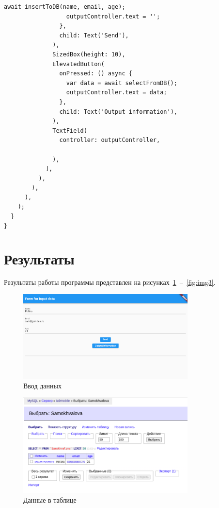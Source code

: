 \documentclass[a4paper, 14pt]{extarticle}
\begin{document}
\begin{lstlisting}[language={},caption={Форма отправки данных в базу данных MySql},label={lst:code1}]
                  await insertToDB(name, email, age);
                  outputController.text = '';
                },
                child: Text('Send'),
              ),
              SizedBox(height: 10),
              ElevatedButton(
                onPressed: () async {
                  var data = await selectFromDB();
                  outputController.text = data;
                },
                child: Text('Output information'),
              ),
              TextField(
                controller: outputController,

              ),
            ],
          ),
        ),
      ),
    );
  }
}
\end{lstlisting}

\section{Результаты}\label{Sect::res}

Результаты работы программы представлен на рисунках~\ref{fig:img1}~--~\ref{fig:img3}.

\begin{figure}[!htb]
	\centering
	\includegraphics[width=0.8\textwidth]{img1}
\caption{Ввод данных}
\label{fig:img1}
\end{figure}

\begin{figure}[!htb]
	\centering
	\includegraphics[width=0.8\textwidth]{img2}
\caption{Данные в таблице}
\label{fig:img2}
\end{figure}
\end{document}
